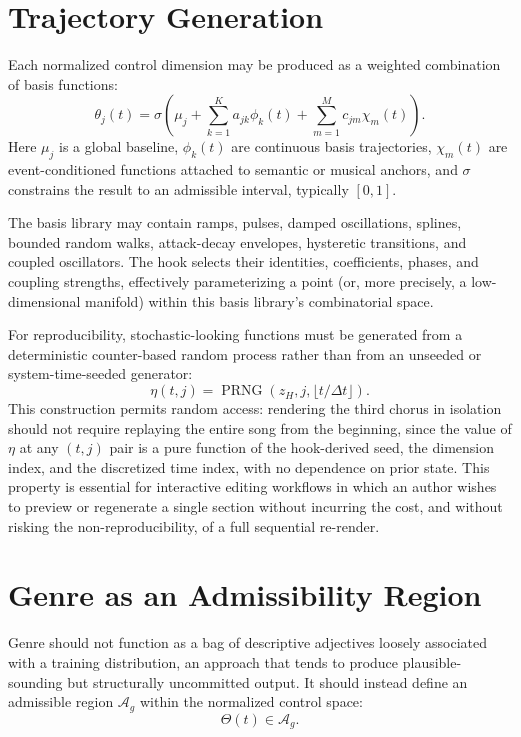\documentclass[11pt]{article}
\DeclareMathOperator{\PRNG}{PRNG}
\begin{document}
\section{Trajectory Generation}

Each normalized control dimension may be produced as a weighted combination of basis functions:
\[
\theta_j(t)
=
\sigma\left(
\mu_j
+
\sum_{k=1}^{K}
a_{jk}\phi_k(t)
+
\sum_{m=1}^{M}
c_{jm}\chi_m(t)
\right).
\]
Here $\mu_j$ is a global baseline, $\phi_k(t)$ are continuous basis trajectories, $\chi_m(t)$ are event-conditioned functions attached to semantic or musical anchors, and $\sigma$ constrains the result to an admissible interval, typically $[0,1]$.

The basis library may contain ramps, pulses, damped oscillations, splines, bounded random walks, attack-decay envelopes, hysteretic transitions, and coupled oscillators. The hook selects their identities, coefficients, phases, and coupling strengths, effectively parameterizing a point (or, more precisely, a low-dimensional manifold) within this basis library's combinatorial space.

For reproducibility, stochastic-looking functions must be generated from a deterministic counter-based random process rather than from an unseeded or system-time-seeded generator:
\[
\eta(t,j)=
\PRNG
\left(
z_H,j,\lfloor t/\Delta t\rfloor
\right).
\]
This construction permits random access: rendering the third chorus in isolation should not require replaying the entire song from the beginning, since the value of $\eta$ at any $(t,j)$ pair is a pure function of the hook-derived seed, the dimension index, and the discretized time index, with no dependence on prior state. This property is essential for interactive editing workflows in which an author wishes to preview or regenerate a single section without incurring the cost, and without risking the non-reproducibility, of a full sequential re-render.

\section{Genre as an Admissibility Region}
\label{sec:genre}

Genre should not function as a bag of descriptive adjectives loosely associated with a training distribution, an approach that tends to produce plausible-sounding but structurally uncommitted output. It should instead define an admissible region $\mathcal{A}_g$ within the normalized control space:
\[
\Theta(t)\in\mathcal{A}_g.
\]
\end{document}

